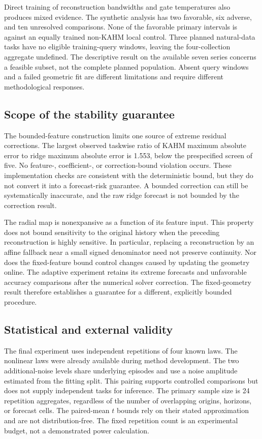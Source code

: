 Direct training of reconstruction bandwidths and gate temperatures also
produces mixed evidence. The synthetic analysis has two favorable, six
adverse, and ten unresolved comparisons. None of the favorable primary
intervals is against an equally trained non-KAHM local control. Three
planned natural-data tasks have no eligible training-query windows,
leaving the four-collection aggregate undefined. The descriptive result
on the available seven series concerns a feasible subset, not the
complete planned population. Absent query windows and a failed geometric
fit are different limitations and require different methodological
responses.

\subsection{Scope of the stability guarantee}
The bounded-feature construction limits one source of extreme residual
corrections. The largest observed taskwise ratio of KAHM maximum absolute
error to ridge maximum absolute error is 1.553, below the prespecified
screen of five. No feature-, coefficient-, or correction-bound violation
occurs. These implementation checks are consistent with the deterministic
bound, but they do not convert it into a forecast-risk guarantee. A
bounded correction can still be systematically inaccurate, and the raw
ridge forecast is not bounded by the correction result.

The radial map is nonexpansive as a function of its feature input. This
property does not bound sensitivity to the original history when the
preceding reconstruction is highly sensitive. In particular, replacing
a reconstruction by an affine fallback near a small signed denominator
need not preserve continuity. Nor does the fixed-feature bound control
changes caused by updating the geometry online. The adaptive experiment
retains its extreme forecasts and unfavorable accuracy comparisons after
the numerical solver correction. The fixed-geometry result therefore
establishes a guarantee for a different, explicitly bounded procedure.

\subsection{Statistical and external validity}
The final experiment uses independent repetitions of four known laws.
The nonlinear laws were already available during method development.
The two additional-noise levels share underlying episodes and use a
noise amplitude estimated from the fitting split. This pairing supports
controlled comparisons but does not supply independent tasks for
inference. The primary sample size is 24 repetition aggregates, regardless
of the number of overlapping origins, horizons, or forecast cells.
The paired-mean $t$ bounds rely on their stated approximation and are not
distribution-free. The fixed repetition count is an experimental budget,
not a demonstrated power calculation.

